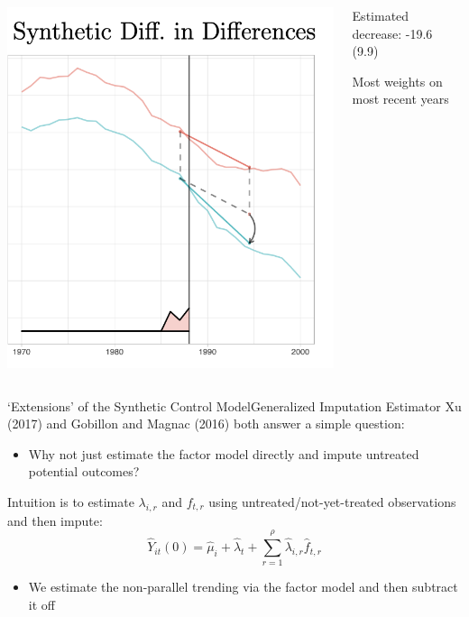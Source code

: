 \documentclass[t]{beamer}
\begin{document}
\begin{columns}[T]
  \begin{column}{.65\textwidth}
    \includegraphics[width=\textwidth]{lecture_includes/sdid_3.png}
  \end{column}
  \hfill
  \begin{column}{.3\textwidth}
    Estimated decrease: -19.6 (9.9)
    
    \bigskip Most weights on most recent years
  \end{column}
\end{columns}


\begin{frame}{`Extensions' of the Synthetic Control Model}{Generalized Imputation Estimator}
  Xu (2017) and Gobillon and Magnac (2016) both answer a simple question:
  \begin{itemize}
    \item Why not just estimate the factor model directly and impute untreated potential outcomes?
  \end{itemize}

  \bigskip
  Intuition is to estimate $\lambda_{i,r}$ and $f_{t,r}$ using untreated/not-yet-treated observations and then impute:
  $$
    \hat{Y}_{it}(0) = \hat{\mu}_i + \hat{\lambda}_t + \sum_{r=1}^\rho \hat{\lambda}_{i, r} \hat{f}_{t, r}
  $$
  \begin{itemize}
    \item We estimate the non-parallel trending via the factor model and then subtract it off
  \end{itemize}
\end{frame}
\end{document}
